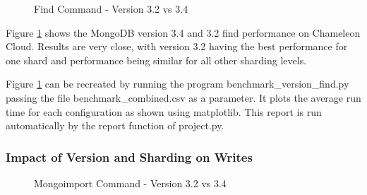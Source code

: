 \documentclass[9pt,twocolumn,twoside]{../../styles/osajnl}
\begin{document}
\begin{figure}[htbp]
\centering
{}
\caption{Find Command - Version 3.2 vs 3.4}
\label{fig:version-find}
\end{figure}

Figure \ref{fig:version-find} shows the MongoDB version 3.4 and 3.2
find performance on Chameleon Cloud. Results are very close, with
version 3.2 having the best performance for one shard and performance
being similar for all other sharding levels.

Figure \ref{fig:version-find} can be recreated by running the program
benchmark\_version\_find.py passing the file benchmark\_combined.csv
as a parameter. It plots the average run time for each configuration
as shown using matplotlib. This report is run automatically by the
report function of project.py.

\subsubsection{Impact of Version and Sharding on Writes}

\begin{figure}[htbp]
\centering
{}
\caption{Mongoimport Command - Version 3.2 vs 3.4}
\label{fig:version-import}
\end{figure}
\end{document}
